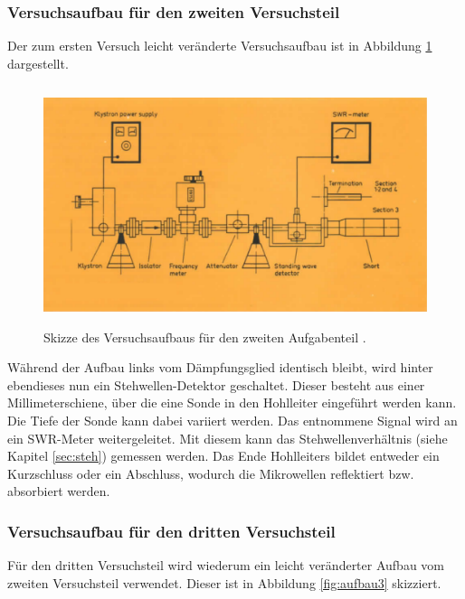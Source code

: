 \subsubsection{Versuchsaufbau für den zweiten Versuchsteil}
\label{sec:aufbau2}

Der zum ersten Versuch leicht veränderte Versuchsaufbau ist in Abbildung \ref{fig:aufbau2} dargestellt.
\begin{figure}
  \centering
  \includegraphics[height=7cm]{ressources/aufbau2.png}
  \caption{Skizze des Versuchsaufbaus für den zweiten Aufgabenteil \cite{skript}.}
  \label{fig:aufbau2}
\end{figure}
Während der Aufbau links vom Dämpfungsglied identisch bleibt, wird hinter ebendieses nun ein Stehwellen-Detektor geschaltet.
Dieser besteht aus einer Millimeterschiene, über die eine Sonde in den Hohlleiter eingeführt werden kann.
Die Tiefe der Sonde kann dabei variiert werden.
Das entnommene Signal wird an ein SWR-Meter weitergeleitet.
Mit diesem kann das Stehwellenverhältnis (siehe Kapitel \ref{sec:steh}) gemessen werden.
Das Ende Hohlleiters bildet entweder ein Kurzschluss oder ein Abschluss, wodurch die Mikrowellen reflektiert bzw. absorbiert werden.

\subsubsection{Versuchsaufbau für den dritten Versuchsteil}
\label{sec:aufbau3}

Für den dritten Versuchsteil wird wiederum ein leicht veränderter Aufbau vom zweiten Versuchsteil verwendet.
Dieser ist in Abbildung \ref{fig:aufbau3} skizziert.

